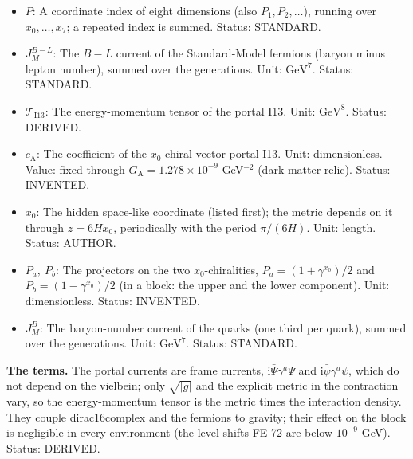 \documentclass[
  10pt,
]{article}
\begin{document}
\begin{itemize}
  with a frame index are the author's real \(16 \times 16\) matrices of
  the Clifford algebra of signature \((4, 4)\);
  \(\gamma^M = \mathbf{e}_a{}^M\gamma^a\) along a coordinate
  (\(\gamma^{x_0}\), \(\gamma^{x_4}\), \ldots{} the matrices along
  \(x_0\), \(x_4\), \ldots), \(\gamma_M = g_{MN}\gamma^N\);
  \(\gamma^\mu\) the matrices of the four observable directions in
  four-dimensional formulas. Unit: dimensionless. Status: AUTHOR.
\item
  \(P\): A coordinate index of eight dimensions (also
  \(P_1, P_2, \dots\)), running over \(x_0, \dots, x_7\); a repeated
  index is summed. Status: STANDARD.
\item
  \(J^{B-L}_M\): The \(B - L\) current of the Standard-Model fermions
  (baryon minus lepton number), summed over the generations. Unit:
  \(\mathrm{GeV}^{7}\). Status: STANDARD.
\item
  \(\mathcal{T}_{\mathrm{I13}}\): The energy-momentum tensor of the
  portal I13. Unit: \(\mathrm{GeV}^{8}\). Status: DERIVED.
\item
  \(c_{\mathrm{A}}\): The coefficient of the \(x_0\)-chiral vector
  portal I13. Unit: dimensionless. Value: fixed through
  \(G_{\mathrm{A}} = 1.278\times10^{-9}\) GeV\(^{-2}\) (dark-matter
  relic). Status: INVENTED.
\item
  \(x_0\): The hidden space-like coordinate (listed first); the metric
  depends on it through \(z = 6Hx_0\), periodically with the period
  \(\pi/(6H)\). Unit: length. Status: AUTHOR.
\item
  \(P_a,\ P_b\): The projectors on the two \(x_0\)-chiralities,
  \(P_a = (1 + \gamma^{x_0})/2\) and \(P_b = (1 - \gamma^{x_0})/2\) (in
  a block: the upper and the lower component). Unit: dimensionless.
  Status: INVENTED.
\item
  \(J^{B}_M\): The baryon-number current of the quarks (one third per
  quark), summed over the generations. Unit: \(\mathrm{GeV}^{7}\).
  Status: STANDARD.
\end{itemize}

\textbf{The terms.} The portal currents are frame currents,
\(\mathrm{i}\bar\Psi\gamma^a\Psi\) and
\(\mathrm{i}\bar\psi\gamma^a\psi\), which do not depend on the vielbein;
only \(\sqrt{\lvert g\rvert}\) and the explicit metric in the
contraction vary, so the energy-momentum tensor is the metric times the
interaction density. They couple dirac16complex and the fermions to
gravity; their effect on the block is negligible in every environment
(the level shifts FE-72 are below \(10^{-9}\) GeV). Status: DERIVED.
\end{document}
